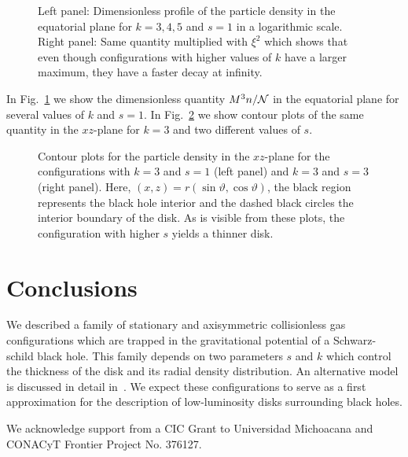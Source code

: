 \documentclass{appolb}
\begin{document}
\begin{figure}[h!]
\centerline{
}
\caption{Left panel: Dimensionless profile of the particle density in the equatorial plane for $k=3,4,5$ and $s=1$ in a logarithmic scale. Right panel: Same quantity multiplied with $\xi^2$ which shows that even though configurations with higher values of $k$ have a larger maximum, they have a faster decay at infinity.}
\label{Fig:ParticleDensitys1k345} 
\end{figure}
In Fig.~\ref{Fig:ParticleDensitys1k345} we show the dimensionless quantity $M^3 n/{\cal N}$ in the equatorial plane for several values of $k$ and $s=1$. In Fig.~\ref{Fig:ContourParticleDensitys1k3} we show contour plots of the same quantity in the $xz$-plane for $k=3$ and two different values of $s$.
\begin{figure}
\centerline{
}
\caption{Contour plots for the particle density in the $xz$-plane for the configurations with $k=3$ and $s=1$ (left panel) and $k=3$ and $s=3$ (right panel). Here, $(x,z) = r(\sin\vartheta,\cos\vartheta)$, the black region represents the black hole interior and the dashed black circles the interior boundary of the disk. As is visible from these plots, the configuration with higher $s$ yields a thinner disk.}
\label{Fig:ContourParticleDensitys1k3} 
\end{figure}

\section{Conclusions}

We described a family of stationary and axisymmetric collisionless gas configurations which are trapped in the gravitational potential of a Schwarz-schild black hole. This family depends on two parameters $s$ and $k$ which control the thickness of the disk and its radial density distribution. An alternative model is discussed in detail in~\cite{cGoS2021b}. We expect these configurations to serve as a first approximation for the description of low-luminosity disks surrounding black holes.

We acknowledge support from a CIC Grant to Universidad Michoacana and CONACyT Frontier Project No. 376127.

\end{document}
